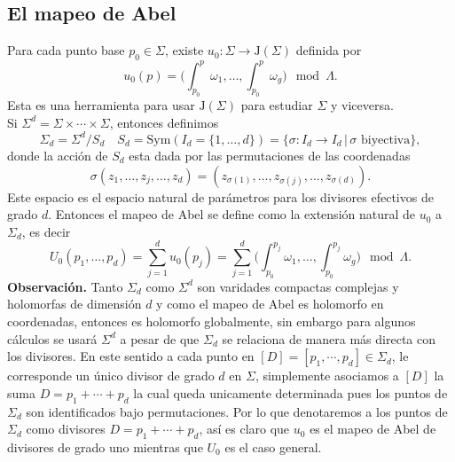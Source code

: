 \documentclass[letterpaper]{article}
\newcommand{\obs}{{\noindent \sc \textbf{Observación. }}}
\newcommand{\sig}{\ensuremath{\Sigma}}
\begin{document}
\subsection{El mapeo de Abel}
\noindent Para cada punto base \(p_{0}\in\sig\), existe \(u_{0}:\sig\rightarrow\mathrm{J}(\sig)\) definida por
\[
  u_{0}(p)=\Big(\int^{p}_{p_{0}}\omega_{1},\dots,\int^{p}_{p_{0}}\omega_{g}\Big)\mod\Lambda.
\]
Esta es una herramienta para usar \(\mathrm{J}(\sig)\) para estudiar \(\sig\) y viceversa.\\
Si \hbox{\(\sig^{d}=\sig\times\cdots\times\sig\)}, entonces definimos
\[
  \sig_{d}=\sig^{d}/S_{d}\quad S_{d}=\mathrm{Sym}(I_{d}=\{1,\dots,d\})=\{\sigma:I_{d}\rightarrow I_{d}\,|\,\sigma\text{ biyectiva}\},
\]
\noindent donde la acción de \(S_{d}\) esta dada por las permutaciones de las coordenadas
\[
  \sigma(z_{1},\dots,z_{j},\dots,z_{d})=(z_{\sigma(1)},\dots,z_{\sigma(j)},\dots,z_{\sigma(d)}).
\]
\noindent Este espacio es el espacio natural de parámetros para los divisores efectivos de grado \(d\). Entonces el mapeo de Abel se define como la extensión natural de \(u_{0}\) a \(\sig_{d}\), es decir
\[
  U_{0}(p_{1},\dots,p_{d})=\sum^{d}_{j=1}u_{0}(p_{j})= \sum^{d}_{j=1}\Big(\int^{p_{j}}_{p_{0}}\omega_{1},\dots,\int^{p_{j}}_{p_{0}}\omega_{g}\Big)\mod\Lambda.
\]
\obs Tanto \(\sig_{d}\) como \(\sig^{d}\) son varidades compactas complejas y holomorfas de dimensión \(d\) y como el mapeo de Abel es holomorfo en coordenadas, entonces es holomorfo globalmente, sin embargo para algunos cálculos se usará \(\sig^{d}\) a pesar de que \(\sig_{d}\) se relaciona de manera más directa con los divisores. En este sentido a cada punto en \([D]=[p_{1},\cdots,p_{d}]\in\sig_{d}\), le corresponde un único divisor de grado \(d\) en \(\sig\), simplemente asociamos a \([D]\) la suma \(D=p_{1}+\cdots+p_{d}\) la cual queda unicamente determinada pues los puntos de \(\sig_{d}\) son identificados bajo permutaciones. Por lo que denotaremos a los puntos de \(\sig_{d}\) como divisores \(D=p_{1}+\cdots+p_{d}\), así es claro que \(u_{0}\) es el mapeo de Abel de divisores de grado uno mientras que \(U_{0}\) es el caso general.
\end{document}
